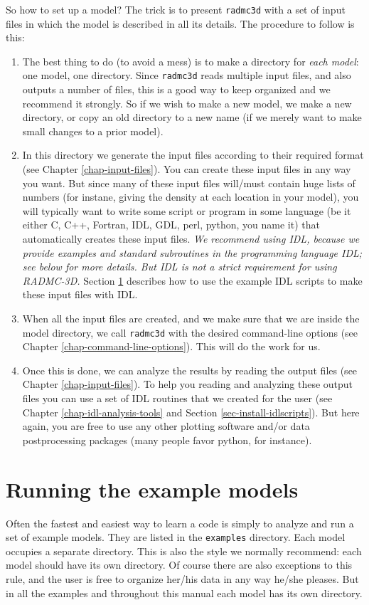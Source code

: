 \documentclass{report}
\begin{document}
So how to set up a model? The trick is to present {\small\tt radmc3d} with a
set of input files in which the model is described in all its details. The
procedure to follow is this:
\begin{enumerate}
\item The best thing to do (to avoid a mess) is to make a directory for {\em
    each model}: one model, one directory. Since {\small\tt radmc3d} reads
  multiple input files, and also outputs a number of files, this is a good
  way to keep organized and we recommend it strongly.  So if we wish to make
  a new model, we make a new directory, or copy an old directory to a new
  name (if we merely want to make small changes to a prior model).
\item In this directory we generate the input files according to their
  required format (see Chapter \ref{chap-input-files}). You can create these
  input files in any way you want. But since many of these input files
  will/must contain huge lists of numbers (for instane, giving the density
  at each location in your model), you will typically want to write some
  script or program in some language (be it either C, C++, Fortran, IDL,
  GDL, perl, python, you name it) that automatically creates these input
  files. {\em We recommend using IDL, because we provide examples and
    standard subroutines in the programming language IDL; see below for more
    details. But IDL is not a strict requirement for using RADMC-3D.}
  Section \ref{sec-example-models} describes how to use the example IDL
  scripts to make these input files with IDL.
\item When all the input files are created, and we make sure that we are
  inside the model directory, we call {\small\tt radmc3d} with the desired
  command-line options (see Chapter \ref{chap-command-line-options}). This
  will do the work for us. 
\item Once this is done, we can analyze the results by reading the output
  files (see Chapter \ref{chap-input-files}). To help you reading and
  analyzing these output files you can use a set of IDL routines that we
  created for the user (see Chapter \ref{chap-idl-analysis-tools} and
  Section \ref{sec-install-idlscripts}). But here again, you are free to use
  any other plotting software and/or data postprocessing packages (many
  people favor python, for instance).
\end{enumerate}



\section{Running the example models}
\label{sec-example-models}
Often the fastest and easiest way to learn a code is simply to analyze and
run a set of example models. They are listed in the {\small\tt examples}
directory. Each model occupies a separate directory. This is also the style
we normally recommend: each model should have its own directory. Of course
there are also exceptions to this rule, and the user is free to organize
her/his data in any way he/she pleases. But in all the examples and
throughout this manual each model has its own directory.
\end{document}
